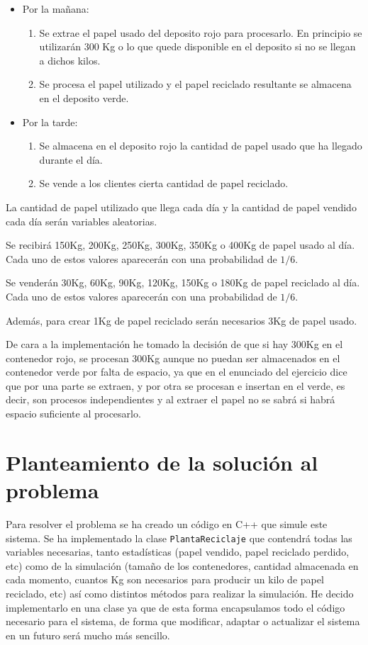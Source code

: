 \documentclass[12pt, spanish]{article}
\begin{document}
\begin{itemize}
	\item Por la mañana:
		\begin{enumerate}
			\item Se extrae el papel usado del deposito rojo para procesarlo. En principio se utilizarán 300 Kg o lo que quede disponible en el deposito si no se llegan a dichos kilos.
			\item Se procesa el papel utilizado y el papel reciclado resultante se almacena en el deposito verde.
		\end{enumerate}

	\item Por la tarde:
		\begin{enumerate}
			\item Se almacena en el deposito rojo la cantidad de papel usado que ha llegado durante el día.
			\item Se vende a los clientes cierta cantidad de papel reciclado.
		\end{enumerate}
\end{itemize}

La cantidad de papel utilizado que llega cada día y la cantidad de papel vendido cada día serán variables aleatorias.

Se recibirá 150Kg, 200Kg, 250Kg, 300Kg, 350Kg o 400Kg de papel usado al día. Cada uno de estos valores aparecerán con una probabilidad de $1/6$.

Se venderán 30Kg, 60Kg, 90Kg, 120Kg, 150Kg o 180Kg de papel reciclado al día. Cada uno de estos valores aparecerán con una probabilidad de $1/6$.

Además, para crear 1Kg de papel reciclado serán necesarios 3Kg de papel usado.


De cara a la implementación he tomado la decisión de que si hay 300Kg en el contenedor rojo, se procesan 300Kg aunque no puedan ser almacenados en el contenedor verde por falta de espacio, ya que en el enunciado del ejercicio dice que por una parte se extraen, y por otra se procesan e insertan en el verde, es decir, son procesos independientes y al extraer el papel no se sabrá si habrá espacio suficiente al procesarlo.

\section{Planteamiento de la solución al problema}

Para resolver el problema se ha creado un código en C++ que simule este sistema. Se ha implementado la clase \texttt{PlantaReciclaje} que contendrá todas las variables necesarias, tanto estadísticas (papel vendido, papel reciclado perdido, etc) como de la simulación (tamaño de los contenedores, cantidad almacenada en cada momento, cuantos Kg son necesarios para producir un kilo de papel reciclado, etc) así como distintos métodos para realizar la simulación. He decido implementarlo en una clase ya que de esta forma encapsulamos todo el código necesario para el sistema, de forma que modificar, adaptar o actualizar el sistema en un futuro será mucho más sencillo.
\end{document}
